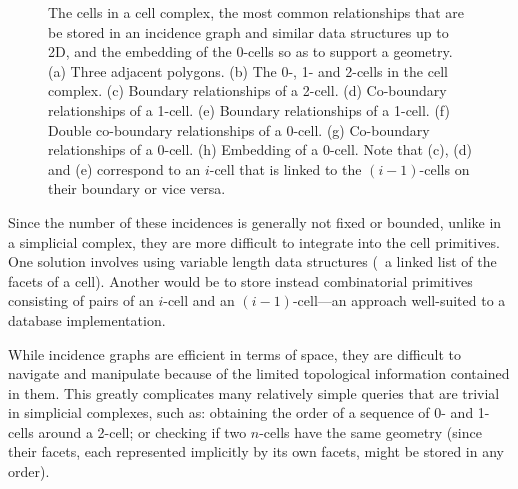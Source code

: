 \begin{figure}[tbp]
{\label{subfig:0-cell-double-star}}
\quad
{}
\quad
{}
\caption[Relationships in an incidence graph]{The cells in a cell complex, the most common relationships that are be stored in an incidence graph and similar data structures up to 2D, and the embedding of the 0-cells so as to support a geometry.
(a) Three adjacent polygons.
(b) The 0-, 1- and 2-cells in the cell complex.
(c) Boundary relationships of a 2-cell.
(d) Co-boundary relationships of a 1-cell.
(e) Boundary relationships of a 1-cell.
(f) Double co-boundary relationships of a 0-cell.
(g) Co-boundary relationships of a 0-cell.
(h) Embedding of a 0-cell.
Note that (c), (d) and (e) correspond to an $i$-cell that is linked to the $(i-1)$-cells on their boundary or vice versa.}
\label{fig:ds_incidence_graph}
\end{figure}
Since the number of these incidences is generally not fixed or bounded, unlike in a simplicial complex, they are more difficult to integrate into the cell primitives.
One solution involves using variable length data structures (\eg\ a linked list of the facets of a cell).
Another would be to store instead combinatorial primitives consisting of pairs of an $i$-cell and an $(i-1)$-cell---an approach well-suited to a database implementation.

While incidence graphs are efficient in terms of space, they are difficult to navigate and manipulate because of the limited topological information contained in them.
This greatly complicates many relatively simple queries that are trivial in simplicial complexes, such as: obtaining the order of a sequence of 0- and 1-cells around a 2-cell; or checking if two $n$-cells have the same geometry (since their facets, each represented implicitly by its own facets, might be stored in any order).

